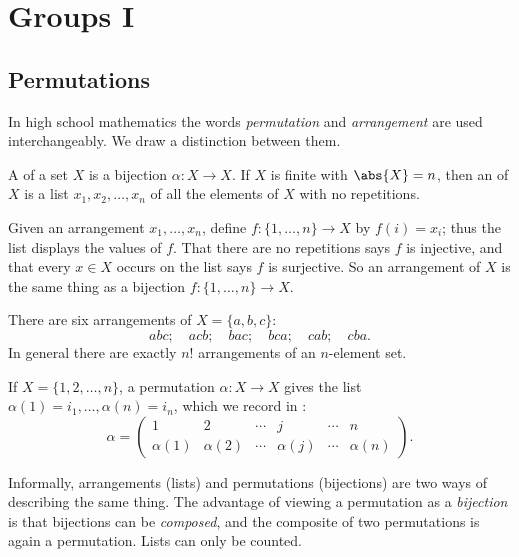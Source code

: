\chapter{Groups I}

\section{Permutations}

In high school mathematics the words \emph{permutation} and \emph{arrangement} are used
interchangeably. We draw a distinction between them.

\begin{definition}
	A  of a set \(X\) is a bijection \(\alpha\colon X \to X\). If \(X\)
	is finite with \(\abs{X} = n\), then an  of \(X\) is a list
	\(x_1, x_2, \dots, x_n\) of all the elements of \(X\) with no repetitions.
\end{definition}

Given an arrangement \(x_1, \dots, x_n\), define \(f\colon \{1, \dots, n\} \to X\) by
\(f(i) = x_i\); thus the list displays the values of \(f\). That there are no repetitions
says \(f\) is injective, and that every \(x \in X\) occurs on the list says \(f\) is
surjective. So an arrangement of \(X\) is the same thing as a bijection
\(f\colon \{1, \dots, n\} \to X\).

\begin{eg}
	There are six arrangements of \(X = \{a,b,c\}\):
	\[
		abc; \quad acb; \quad bac; \quad bca; \quad cab; \quad cba.
	\]
	In general there are exactly \(n!\) arrangements of an \(n\)-element set.
\end{eg}

If \(X = \{1, 2, \dots, n\}\), a permutation \(\alpha\colon X \to X\) gives the list
\(\alpha(1) = i_1, \dots, \alpha(n) = i_n\), which we record in :
\[
	\alpha =
	\begin{pmatrix}
		1         & 2         & \cdots & j            & \cdots & n         \\
		\alpha(1) & \alpha(2) & \cdots & \alpha(j)    & \cdots & \alpha(n)
	\end{pmatrix}.
\]

\begin{intuition}
	Informally, arrangements (lists) and permutations (bijections) are two ways of
	describing the same thing. The advantage of viewing a permutation as a \emph{bijection}
	is that bijections can be \emph{composed}, and the composite of two permutations is
	again a permutation. Lists can only be counted.
\end{intuition}

